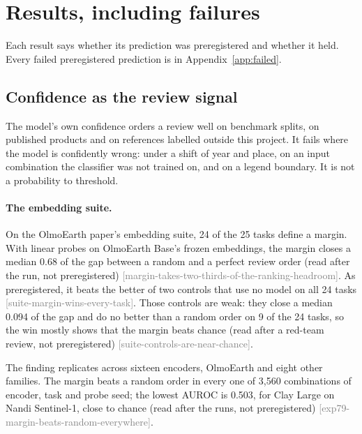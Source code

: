 \documentclass[11pt,a4paper]{article}
\newcommand{\claim}[1]{{\scriptsize\textsf{\textcolor{gray}{[#1]}}}}
\begin{document}
\section{Results, including failures}
\label{sec:results}

Each result says whether its prediction was preregistered and whether it held. Every failed preregistered prediction
is in Appendix~\ref{app:failed}.

\subsection{Confidence as the review signal}
\label{sec:res-confidence}

The model's own confidence orders a review well on benchmark splits, on published products and on references labelled
outside this project. It fails where the model is confidently wrong: under a shift of year and place, on an input
combination the classifier was not trained on, and on a legend boundary. It is not a probability to threshold.

\paragraph{The embedding suite.}
\label{sec:res-suite}
On the OlmoEarth paper's embedding suite, 24 of the 25 tasks define a margin. With linear probes on OlmoEarth Base's
frozen embeddings, the margin closes a median 0.68 of the gap between a random and a perfect review order (read after
the run, not preregistered) \claim{margin-takes-two-thirds-of-the-ranking-headroom}. As preregistered, it beats the
better of two controls that use no model on all 24 tasks \claim{suite-margin-wins-every-task}. Those controls are
weak: they close a median 0.094 of the gap and do no better than a random order on 9 of the 24 tasks, so the win
mostly shows that the margin beats chance (read after a red-team review, not preregistered)
\claim{suite-controls-are-near-chance}.

The finding replicates across sixteen encoders, OlmoEarth and eight other families. The margin beats a random order
in every one of 3,560 combinations of encoder, task and probe seed; the lowest AUROC is 0.503, for Clay Large on
Nandi Sentinel-1, close to chance (read after the runs, not preregistered)
\claim{exp79-margin-beats-random-everywhere}.
\end{document}
